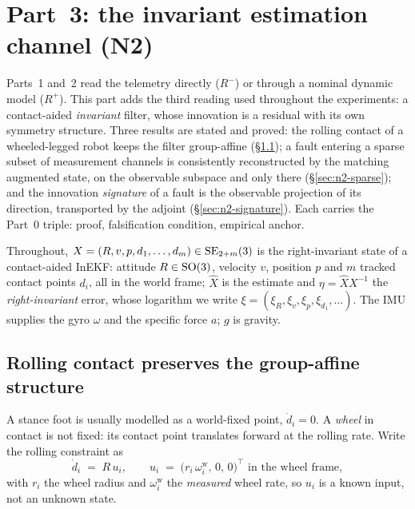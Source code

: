 \section{Part~3: the invariant estimation channel (N2)}
\label{sec:part3n2}

Parts~1 and~2 read the telemetry directly ($R^-$) or through a nominal dynamic
model ($R^+$). This part adds the third reading used throughout the
experiments: a contact-aided \emph{invariant} filter, whose innovation is a
residual with its own symmetry structure. Three results are stated and proved:
the rolling contact of a wheeled-legged robot keeps the filter group-affine
(\S\ref{sec:n2-rolling}); a fault entering a sparse subset of measurement
channels is consistently reconstructed by the matching augmented state, on the
observable subspace and only there (\S\ref{sec:n2-sparse}); and the innovation
\emph{signature} of a fault is the observable projection of its direction,
transported by the adjoint (\S\ref{sec:n2-signature}). Each carries the Part~0
triple: proof, falsification condition, empirical anchor.

Throughout, $X = (R, v, p, d_1, \dots, d_m) \in \mathrm{SE}_{2+m}(3)$ is the
right-invariant state of a contact-aided InEKF: attitude $R \in \mathrm{SO}(3)$,
velocity $v$, position $p$ and $m$ tracked contact points $d_i$, all in the
world frame; $\hat X$ is the estimate and
$\eta = \hat X X^{-1}$ the \emph{right-invariant} error, whose logarithm we
write $\xi = (\xi_R, \xi_v, \xi_p, \xi_{d_1}, \dots)$. The IMU supplies the
gyro $\omega$ and the specific force $a$; $g$ is gravity.

\subsection{Rolling contact preserves the group-affine structure}
\label{sec:n2-rolling}

A stance foot is usually modelled as a world-fixed point, $\dot d_i = 0$. A
\emph{wheel} in contact is not fixed: its contact point translates forward at
the rolling rate. Write the rolling constraint as
\begin{equation}
  \label{eq:rolling}
  \dot d_i \;=\; R\, u_i, \qquad
  u_i \;=\; \bigl(r_i\,\omega^{\mathrm{w}}_i,\, 0,\, 0\bigr)^\top \text{ in the wheel frame},
\end{equation}
with $r_i$ the wheel radius and $\omega^{\mathrm{w}}_i$ the \emph{measured}
wheel rate, so $u_i$ is a known input, not an unknown state.

